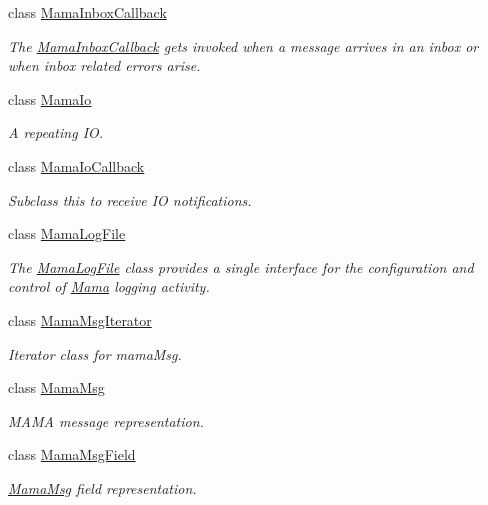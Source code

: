 \begin{DoxyCompactItemize}
class \hyperlink{classWombat_1_1MamaInboxCallback}{MamaInboxCallback}
\begin{DoxyCompactList}\small\item\em The \hyperlink{classWombat_1_1MamaInboxCallback}{MamaInboxCallback} gets invoked when a message arrives in an inbox or when inbox related errors arise. \item\end{DoxyCompactList}\item 
class \hyperlink{classWombat_1_1MamaIo}{MamaIo}
\begin{DoxyCompactList}\small\item\em A repeating IO. \item\end{DoxyCompactList}\item 
class \hyperlink{classWombat_1_1MamaIoCallback}{MamaIoCallback}
\begin{DoxyCompactList}\small\item\em Subclass this to receive IO notifications. \item\end{DoxyCompactList}\item 
class \hyperlink{classWombat_1_1MamaLogFile}{MamaLogFile}
\begin{DoxyCompactList}\small\item\em The {\ttfamily \hyperlink{classWombat_1_1MamaLogFile}{MamaLogFile}} class provides a single interface for the configuration and control of {\ttfamily \hyperlink{classWombat_1_1Mama}{Mama}} logging activity. \item\end{DoxyCompactList}\item 
class \hyperlink{classWombat_1_1MamaMsgIterator}{MamaMsgIterator}
\begin{DoxyCompactList}\small\item\em Iterator class for mamaMsg. \item\end{DoxyCompactList}\item 
class \hyperlink{classWombat_1_1MamaMsg}{MamaMsg}
\begin{DoxyCompactList}\small\item\em MAMA message representation. \item\end{DoxyCompactList}\item 
class \hyperlink{classWombat_1_1MamaMsgField}{MamaMsgField}
\begin{DoxyCompactList}\small\item\em \hyperlink{classWombat_1_1MamaMsg}{MamaMsg} field representation. \item\end{DoxyCompactList}\item 

\end{DoxyCompactItemize}

